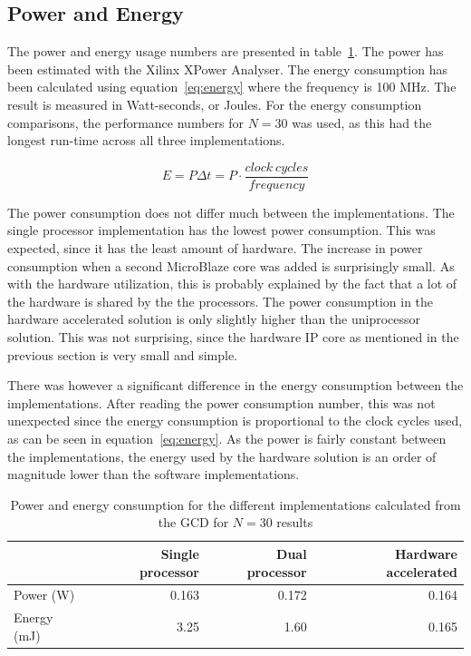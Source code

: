 \documentclass[11pt]{article}
\begin{document}
\subsection{Power and Energy}
The power and energy usage numbers are presented in table~\ref{tab:Power}. The power has been estimated with the Xilinx XPower Analyser. The energy consumption has been calculated using equation~\eqref{eq:energy} where the frequency is 100 MHz. The result is measured in Watt-seconds, or Joules. For the energy consumption comparisons, the performance numbers for $N=30$ was used, as this had the longest run-time across all three implementations.

\begin{equation}
  \label{eq:energy}
  E = P \Delta t = P \cdot \frac{clock\ cycles}{frequency}
\end{equation}

The power consumption does not differ much between the implementations. The single processor implementation has the lowest power consumption. This was expected, since it has the least amount of hardware. The increase in power consumption when a second MicroBlaze core was added is surprisingly small. As with the hardware utilization, this is probably explained by the fact that a lot of the hardware is shared by the the processors. The power consumption in the hardware accelerated solution is only slightly higher than the uniprocessor solution. This was not surprising, since the hardware IP core as mentioned in the previous section is very small and simple.

There was however a significant difference in the energy consumption between the implementations. After reading the power consumption number, this was not unexpected since the energy consumption is proportional to the clock cycles used, as can be seen in equation~\eqref{eq:energy}. As the power is fairly constant between the implementations, the energy used by the hardware solution is an order of magnitude lower than the software implementations.

\begin{table}
  \centering
  \begin{tabular}{lrrr}
    \toprule
    & Single processor  & Dual processor    & Hardware accelerated\\
    \midrule
    Power (W)   & 0.163         & 0.172         & 0.164\\

    Energy (mJ) & 3.25       & 1.60     & 0.165\\
    \bottomrule
  \end{tabular}
  \caption{Power and energy consumption for the different implementations calculated from the GCD for $N=30$ results}
  \label{tab:Power}
\end{table}
\end{document}
